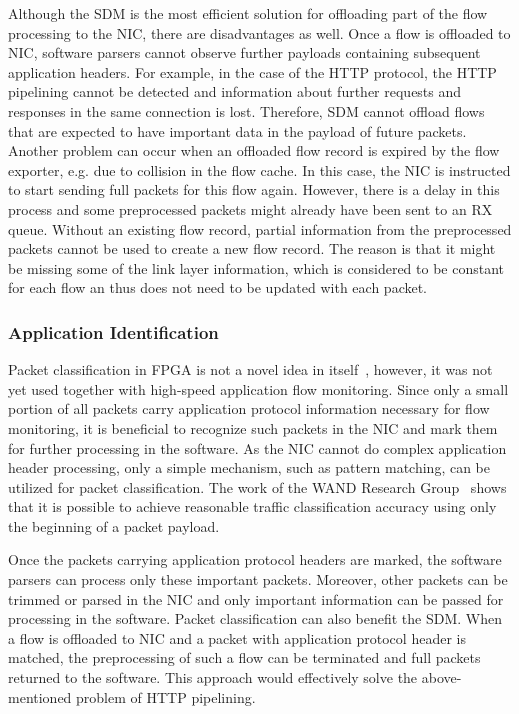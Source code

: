 Although the SDM is the most efficient solution for offloading part of the flow processing to the NIC, there are disadvantages as well. Once a flow is offloaded to NIC, software parsers cannot observe further payloads containing subsequent application headers. For example, in the case of the HTTP protocol, the HTTP pipelining cannot be detected and information about further requests and responses in the same connection is lost. Therefore, SDM cannot offload flows that are expected to have important data in the payload of future packets. Another problem can occur when an offloaded flow record is expired by the flow exporter, e.g. due to collision in the flow cache. In this case, the NIC is instructed to start sending full packets for this flow again. However, there is a delay in this process and some preprocessed packets might already have been sent to an RX queue. Without an existing flow record, partial information from the preprocessed packets cannot be used to create a new flow record. The reason is that it might be missing some of the link layer information, which is considered to be constant for each flow an thus does not need to be updated with each packet.

\subsubsection{Application Identification}

Packet classification in FPGA is not a novel idea in itself~\cite{Song-2005-Efficient}, however, it was not yet used together with high-speed application flow monitoring. Since only a small portion of all packets carry application protocol information necessary for flow monitoring, it is beneficial to recognize such packets in the NIC and mark them for further processing in the software. As the NIC cannot do complex application header processing, only a simple mechanism, such as pattern matching, can be utilized for packet classification. The work of the WAND Research Group~\cite{Alcock-2012-libprotoident} shows that it is possible to achieve reasonable traffic classification accuracy using only the beginning of a packet payload. 

Once the packets carrying application protocol headers are marked, the software parsers can process only these important packets. Moreover, other packets can be trimmed or parsed in the NIC and only important information can be passed for processing in the software. Packet classification can also benefit the SDM. When a flow is offloaded to NIC and a packet with application protocol header is matched, the preprocessing of such a flow can be terminated and full packets returned to the software. This approach would effectively solve the above-mentioned problem of HTTP pipelining. 

